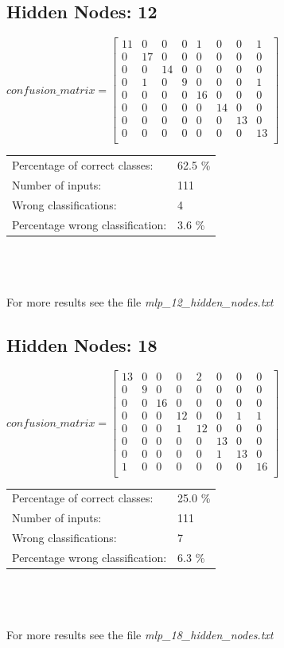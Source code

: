 \documentclass[10pt,a4paper]{article}
\begin{document}
 	\subsection{Hidden Nodes: 12}
 		\begin{center}
 		$ confusion\_matrix = \begin{bmatrix}
 		11& 0& 0& 0& 1& 0& 0& 1 \\
 		0& 17& 0& 0& 0& 0& 0& 0 \\
 		0& 0& 14& 0& 0& 0& 0& 0 \\
 		0& 1& 0& 9& 0& 0& 0& 1 \\
 		0& 0& 0& 0& 16& 0& 0& 0 \\
 		0& 0& 0& 0& 0& 14& 0& 0 \\
 		0& 0& 0& 0& 0& 0& 13& 0 \\
 		0& 0& 0& 0& 0& 0& 0& 13 \\
 		\end{bmatrix}$
 	\end{center}
	 \begin{tabular} {ll}
	 	Percentage of correct classes: &  62.5 \% \\
	 	Number of inputs: & 111 \\
	 	Wrong classifications: & 4 \\
	 	Percentage wrong classification: & 3.6 \% \\
	 \end{tabular}
 	\\ 
 	\\ \\
 	For more results see the file \textit{mlp\_12\_hidden\_nodes.txt}
 	\subsection{Hidden Nodes: 18}
 		\begin{center}
 		$ confusion\_matrix = \begin{bmatrix}
 		13& 0& 0& 0& 2& 0& 0& 0 \\
 		0& 9& 0& 0& 0& 0& 0& 0 \\
 		0& 0& 16& 0& 0& 0& 0& 0 \\
 		0& 0& 0& 12& 0& 0& 1& 1 \\
 		0& 0& 0& 1& 12& 0& 0& 0 \\
 		0& 0& 0& 0& 0& 13& 0& 0 \\
 		0& 0& 0& 0& 0& 1& 13& 0 \\
 		1& 0& 0& 0& 0& 0& 0& 16 \\
 		\end{bmatrix}$
 	\end{center}
 	\begin{tabular} {ll}
 		Percentage of correct classes: &  25.0 \% \\
 		Number of inputs: & 111 \\
 		Wrong classifications: & 7 \\
 		Percentage wrong classification: & 6.3 \% \\
 	\end{tabular}
 	\\ 
 	\\ \\
 	For more results see the file \textit{mlp\_18\_hidden\_nodes.txt}			  
	 
\end{document}
